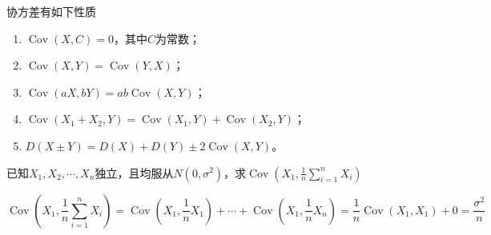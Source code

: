 协方差有如下性质
\begin{enumerate}[(1)]
    \item $\operatorname{Cov}(X,C)=0$，其中$C$为常数；
    \item $\operatorname{Cov}(X,Y) = \operatorname{Cov}(Y,X)$；
    \item $\operatorname{Cov}(aX,bY)=ab\operatorname{Cov}(X,Y)$；
    \item $\operatorname{Cov}(X_1+X_2,Y)=\operatorname{Cov}(X_1,Y)+\operatorname{Cov}(X_2,Y)$；
    \item $D(X\pm Y) = D(X)+D(Y)\pm 2\operatorname{Cov}(X,Y)$。
\end{enumerate}

\begin{example}
    已知$X_1,X_2,\cdots,X_n$独立，且均服从$N(0,\sigma^2)$，求$\operatorname{Cov}\left(X_1, \frac{1}{n}\sum_{i=1}^n X_i\right)$
\end{example}
\begin{solution}
    \[
        \operatorname{Cov}\left(X_1, \frac{1}{n}\sum_{i=1}^n X_i\right)
        =
        \operatorname{Cov}\left(X_1,\frac{1}{n}X_1\right) + \cdots + \operatorname{Cov}\left(X_1,\frac{1}{n}X_n\right)
        =
        \frac{1}{n}\operatorname{Cov}(X_1,X_1) + 0
        =
        \frac{\sigma^2}{n}
    \]
\end{solution}


